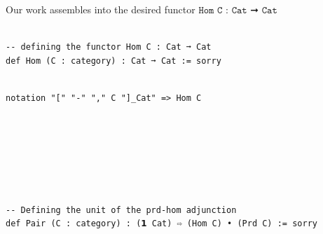 \documentclass{book}
\newcounter{lcounter}
\newcounter{sectioncount}
\newcounter{subsectioncount}
\renewcommand{\section}[1]{\newpage
\ \\
\ \\
 \begin{center} \scalebox{1.5}{\texttt{\thesectioncount . #1}} \setcounter{sectioncount}{\thesectioncount+1} \setcounter{subsectioncount}{1} \end{center}
 \begin{center}

\ \\
\ \\

\thispagestyle{empty}
\end{center}
}
\begin{document}
Our work assembles into the desired functor $\texttt{Hom C : Cat ➞ Cat}$

\begin{center}
\begin{tcolorbox}[width=5in,colback={white},title={\begin{center}\texttt{Lean \thelcounter} \addtocounter{lcounter}{1}  \end{center}},colbacktitle=Blue,coltitle=black]
\begin{verbatim}

-- defining the functor Hom C : Cat ➞ Cat
def Hom (C : category) : Cat ➞ Cat := sorry

\end{verbatim}%
\end{tcolorbox}
\end{center}

\begin{center}
\begin{tcolorbox}[width=5in,colback={white},title={\begin{center}\texttt{Lean \thelcounter} \addtocounter{lcounter}{1}  \end{center}},colbacktitle=Blue,coltitle=black]
\begin{verbatim}

notation "[" "-" "," C "]_Cat" => Hom C

\end{verbatim}%
\end{tcolorbox}
\end{center}

\section{\texttt{X × - ⊣ [X, -], η, ε}} %

\begin{center}
\begin{tcolorbox}[width=5in,colback={white},title={\begin{center}\texttt{Lean \thelcounter} \addtocounter{lcounter}{1}  \end{center}},colbacktitle=Blue,coltitle=black]
\begin{verbatim}

-- Defining the unit of the prd-hom adjunction
def Pair (C : category) : (𝟭 Cat) ⇨ (Hom C) • (Prd C) := sorry

\end{verbatim}%
\end{tcolorbox}
\end{center}
\end{document}
